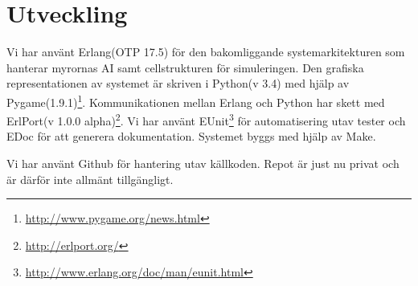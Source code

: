 \chapter{Utveckling}

\label{Utveckling} 


Vi har använt Erlang(OTP 17.5) för den bakomliggande systemarkitekturen som hanterar myrornas AI samt cellstrukturen för simuleringen. Den grafiska representationen av systemet är skriven i Python(v 3.4) med hjälp av Pygame(1.9.1)\footnote{\url{http://www.pygame.org/news.html}}. Kommunikationen mellan Erlang och Python har skett med ErlPort(v 1.0.0 alpha)\footnote{\url{http://erlport.org/}}. Vi har använt EUnit\footnote{\url{http://www.erlang.org/doc/man/eunit.html}} för automatisering utav tester och EDoc för att generera dokumentation. Systemet byggs med hjälp av Make.


Vi har använt Github för hantering utav källkoden. Repot är just nu privat och är därför inte allmänt tillgängligt.

